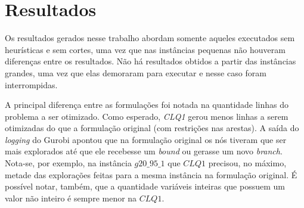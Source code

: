 \documentclass[12pt]{article}
\begin{document}
\section{Resultados}

Os resultados gerados nesse trabalho abordam somente aqueles executados sem heurísticas e sem cortes, uma vez que nas instâncias pequenas não houveram diferenças entre os resultados. Não há resultados obtidos a partir das instâncias grandes, uma vez que elas demoraram para executar e nesse caso foram interrompidas.

A principal diferença entre as formulações foi notada na quantidade linhas do problema a ser otimizado. Como esperado, \textsl{CLQ1} gerou menos linhas a serem otimizadas do que a formulação original (com restrições nas arestas). A saída do \textit{logging} do Gurobi apontou que na formulação original os nós tiveram que ser mais explorados até que ele recebesse um \textit{bound} ou gerasse um novo \textit{branch}. Nota-se, por exemplo, na instância $g20\_95\_1$ que $CLQ1$ precisou, no máximo, metade das explorações feitas para a mesma instância na formulação original. É possível notar, também, que a quantidade variáveis inteiras que possuem um valor não inteiro é sempre menor na $CLQ1$.
\end{document}
